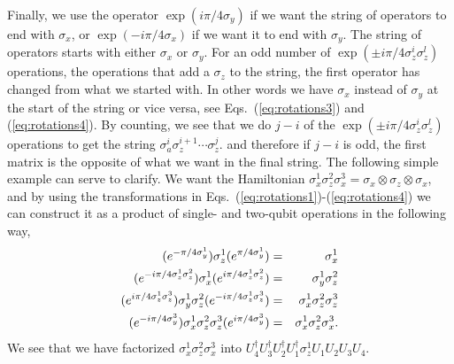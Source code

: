 \documentclass[aps,pra,twocolumn,floatfix]{revtex4}
\begin{document}
Finally, we use the operator $\exp(i\pi/4\sigma_y)$ if we want the
string of operators to end with $\sigma_x$, or  $\exp(-i\pi/4\sigma_x)$
if we want it to end with $\sigma_y$.
The string of operators starts with either $\sigma_x$ or $\sigma_y$. For an odd
number of $\exp(\pm i\pi/4\sigma_z^i \sigma_z^l)$ operations, the
operations that add a $\sigma_z$ to the string, the first
operator has changed from what we started with. In other words we have
$\sigma_x$ instead of $\sigma_y$ at the start of the string or vice
versa, see Eqs.~(\ref{eq:rotations3}) and (\ref{eq:rotations4}).
By counting, we see that we do 
$j-i$ of the  $\exp(\pm i\pi/4\sigma_z^i \sigma_z^l)$
operations to get the string
$\sigma_a^i\sigma_z^{i+1}\cdots\sigma_z^j$. 
and therefore if $j-i$ is odd, the first matrix is the opposite of
what we want in the final string.
The following simple example can serve to clarify.
We want the Hamiltonian
$\sigma_x^1\sigma_z^2\sigma_x^3= \sigma_x\otimes \sigma_z \otimes
\sigma_x$, and by using the transformations in
Eqs.~(\ref{eq:rotations1})-(\ref{eq:rotations4}) we can construct it
as a product of single- and two-qubit operations in the following way,
\begin{eqnarray}
(e^{-\pi/4\sigma_y^1}) \sigma_z^1 (e^{\pi/4\sigma_y^1})&=&\sigma_x^1
\notag\\
 (e^{-i\pi/4\sigma_z^1\sigma_z^2}) \sigma_x^1
 (e^{i\pi/4\sigma_z^1\sigma_z^2}) & = & \sigma_y^1\sigma_z^2 \notag \\
(e^{i\pi/4\sigma_z^1\sigma_z^3}) \sigma_y^1\sigma_z^2
(e^{-i\pi/4\sigma_z^1\sigma_z^3}) & = & \sigma_x^1\sigma_z^2 \sigma_z^3
\notag\\
(e^{-i\pi/4\sigma_y^3}) \sigma_x^1\sigma_z^2 \sigma_z^3
(e^{i\pi/4\sigma_y^3}) & =& \sigma_x^1\sigma_z^2\sigma_x^3.
\end{eqnarray}
We see that we have factorized $\sigma_x^1\sigma_z^2\sigma_x^3$ into
$U_4^\dag U_3^\dag U_2^\dag U_1^\dag \sigma_z^1 U_1 U_2 U_3U_4$.
\end{document}
